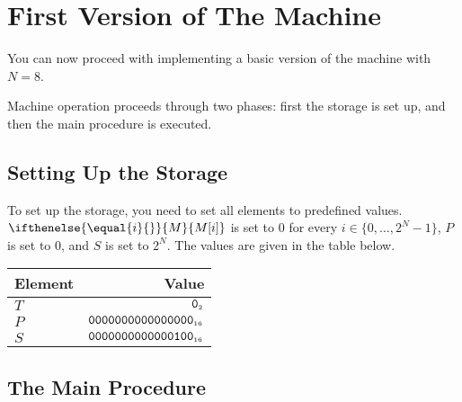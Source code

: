 \documentclass[a4paper,12pt]{article}
\newcommand{\num}[1]{\texttt{#1}}
\newcommand{\hex}[1]{\num{#1}_{\textup{\tiny 16}}}
\newcommand{\bin}[1]{\num{#1}_{\textup{\tiny 2}}}
\newcommand{\MEM}[1]{\ifthenelse{\equal{#1}{}}{M}{M[#1]}}
\newcommand{\PC}{P}
\newcommand{\SP}{S}
\newcommand{\TERM}{T}
\newcommand{\F}{\bin{0}}
\newcommand{\range}[2]{\{#1,\ldots,#2\}}
\begin{document}
\section{First Version of The Machine}

You can now proceed with implementing a basic version of the machine with $N=8$.

Machine operation proceeds through two phases: first the storage is set up, and then the main procedure is executed.

\subsection{Setting Up the Storage}

To set up the storage, you need to set all elements to predefined values.
$\MEM{i}$ is set to 0 for every $i \in \range{0}{2^N-1}$, $\PC$ is set to $0$, and $\SP$ is set to $2^N$.
The values are given in the table below.

\begin{center}
  \begin{tabular}{@{}lr@{}}
    \hline
    Element  & Value                   \\
    \hline
    $\TERM$          & $\F$                      \\
    $\PC$            & $\hex{0000000000000000}$  \\
    $\SP$            & $\hex{0000000000000100}$  \\
    \hline
  \end{tabular}
\end{center}

\subsection{The Main Procedure}
\end{document}

